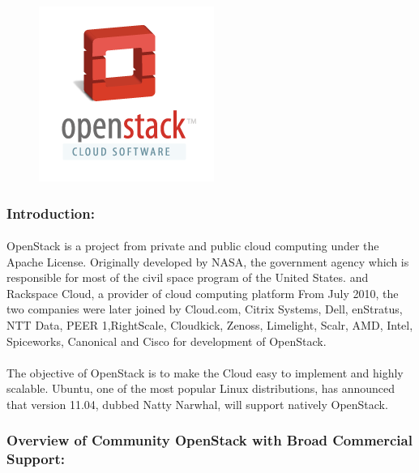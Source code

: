 \begin{figure}[!h]
 \center
\includegraphics{./images/OpenStack.png}
\end{figure}



\subsubsection{Introduction:}

 \paragraph{}OpenStack is a project from private and public cloud computing under the Apache License.
  Originally developed by NASA, the government agency which is responsible for most of the civil space program of the United States.
and Rackspace Cloud, a provider of cloud computing platform 
From July 2010, the two companies were later joined by Cloud.com, Citrix Systems,
 Dell, enStratus, NTT Data, PEER 1,RightScale, Cloudkick, Zenoss, Limelight, Scalr, AMD, Intel, Spiceworks, Canonical and Cisco for development of OpenStack.

 \paragraph{}The objective of OpenStack is to make the Cloud easy to implement and highly scalable. Ubuntu, one of the most popular Linux distributions,
 has announced that version 11.04, dubbed Natty Narwhal, will support natively OpenStack.
\newpage
\subsubsection{ Overview of Community OpenStack with Broad Commercial Support:}

